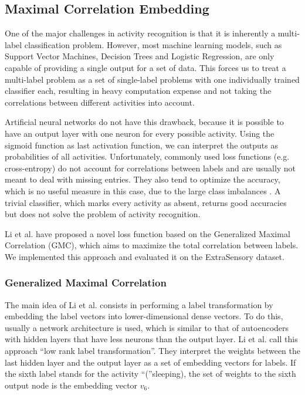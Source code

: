 \subsection{Maximal Correlation Embedding}

One of the major challenges in activity recognition is that it is inherently a multi-label classification problem. However, most machine learning models, such as Support Vector Machines, Decision Trees and Logistic Regression, are only capable of providing a single output for a set of data. This forces us to treat a multi-label problem as a set of single-label problems with one individually trained classifier each, resulting in heavy computation expense and not taking the correlations between different activities into account.

Artificial neural networks do not have this drawback, because it is possible to have an output layer with one neuron for every possible activity. Using the sigmoid function as last activation function, we can interpret the outputs as probabilities of all activities. Unfortunately, commonly used loss functions (e.g. cross-entropy) do not account for correlations between labels and are usually not meant to deal with missing entries. They also tend to optimize the accuracy, which is no useful measure in this case, due to the large class imbalances \cite{Vaizman17}. A trivial classifier, which marks every activity as absent, returns good accuracies but does not solve the problem of activity recognition.

Li et al. \cite{Li19} have proposed a novel loss function based on the Generalized Maximal Correlation (GMC), which aims to maximize the total correlation between labels. We implemented this approach and evaluated it on the ExtraSensory dataset.

\subsubsection{Generalized Maximal Correlation}

The main idea of Li et al. \cite{li2019} consists in performing a label transformation by embedding the label vectors into lower-dimensional dense vectors. To do this, usually a network architecture is used, which is similar to that of autoencoders with hidden layers that have less neurons than the output layer. Li et al. call this approach \enquote{low rank label transformation}. They interpret the weights between the last hidden layer and the output layer as a set of embedding vectors for labels. If the sixth label stands for the activity \enquote(sleeping), the set of weights to the sixth output node is the embedding vector $v_6$.

